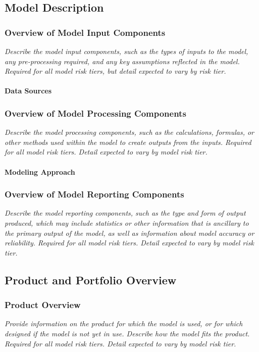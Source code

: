 \documentclass[12pt,letterpaper]{article}
\begin{document}
\subsection{Model Description}

\subsubsection{Overview of Model Input Components}
\textit{Describe the model input components, such as the types of inputs to the model, any pre-processing required, and any key assumptions reflected in the model. Required for all model risk tiers, but detail expected to vary by risk tier.}

\paragraph{Data Sources}

\subsubsection{Overview of Model Processing Components}
\textit{Describe the model processing components, such as the calculations, formulas, or other methods used within the model to create outputs from the inputs. Required for all model risk tiers. Detail expected to vary by model risk tier.}

\paragraph{Modeling Approach}

\subsubsection{Overview of Model Reporting Components}
\textit{Describe the model reporting components, such as the type and form of output produced, which may include statistics or other information that is ancillary to the primary output of the model, as well as information about model accuracy or reliability. Required for all model risk tiers. Detail expected to vary by model risk tier.}

\subsection{Product and Portfolio Overview}

\subsubsection{Product Overview}
\textit{Provide information on the product for which the model is used, or for which designed if the model is not yet in use. Describe how the model fits the product. Required for all model risk tiers. Detail expected to vary by model risk tier.}
\end{document}
